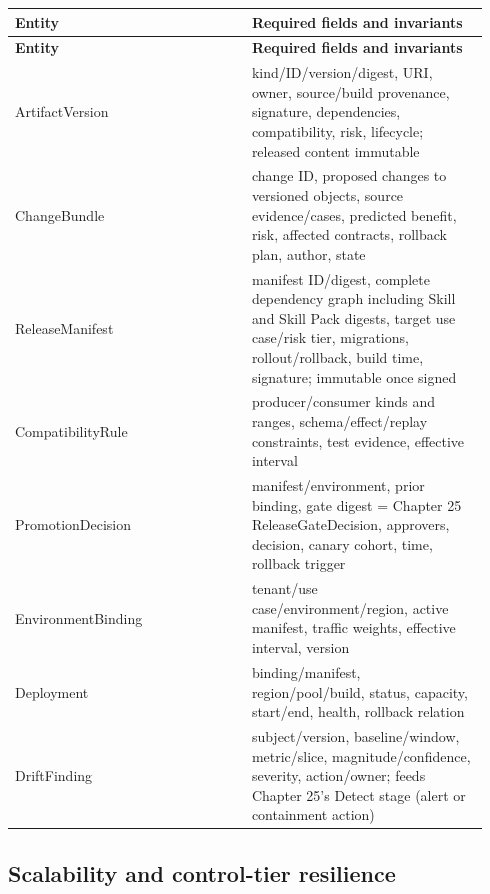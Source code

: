 \BookTableStart
\small
\begin{longtable}{@{}Y{0.4700\linewidth}Y{0.4700\linewidth}@{}}
\color{white}\bfseries \textbf{Entity} & \color{white}\bfseries \textbf{Required fields and invariants} \\
\endfirsthead
{}
\color{white}\bfseries \textbf{Entity} & \color{white}\bfseries \textbf{Required fields and invariants} \\
\endhead
ArtifactVersion & kind/ID/version/digest, URI, owner, source/build provenance, signature, dependencies, compatibility, risk, lifecycle; released content immutable \\
ChangeBundle & change ID, proposed changes to versioned objects, source evidence/cases, predicted benefit, risk, affected contracts, rollback plan, author, state \\
ReleaseManifest & manifest ID/digest, complete dependency graph including Skill and Skill Pack digests, target use case/risk tier, migrations, rollout/rollback, build time, signature; immutable once signed \\
CompatibilityRule & producer/consumer kinds and ranges, schema/effect/replay constraints, test evidence, effective interval \\
PromotionDecision & manifest/environment, prior binding, gate digest = Chapter 25 ReleaseGateDecision, approvers, decision, canary cohort, time, rollback trigger \\
EnvironmentBinding & tenant/use case/environment/region, active manifest, traffic weights, effective interval, version \\
Deployment & binding/manifest, region/pool/build, status, capacity, start/end, health, rollback relation \\
DriftFinding & subject/version, baseline/window, metric/slice, magnitude/confidence, severity, action/owner; feeds Chapter 25's Detect stage (alert or containment action) \\
\end{longtable}
\BookTableEnd

\subsection{Scalability and control-tier resilience}

